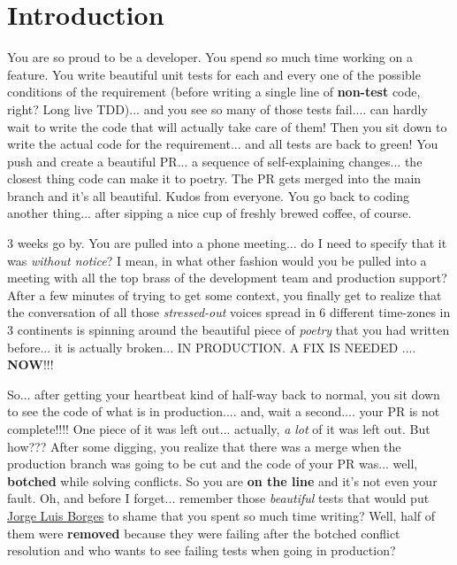 
\section{Introduction}

You are so proud to be a developer. You spend so much time working on a feature. You write beautiful unit tests
for each and every one of the possible conditions of the requirement (before writing a single
line of {\bf non-test} code, right? Long live TDD)... and you see so many of those tests fail.... can hardly wait to
write the code that will actually take care of them! Then you sit down to write the actual code for the requirement...
and all tests are back to green! You push and create a beautiful PR... a sequence of self-explaining changes...
the closest thing code can make it to poetry. The PR gets merged into the main branch and it's all beautiful. Kudos
from everyone. You go back to coding another thing... after sipping a nice cup of freshly brewed coffee, of course.

3 weeks go by. You are pulled into a phone meeting... do I need to specify that it was {\it without notice}? I mean,
in what other fashion would you be pulled into a meeting with all the top brass of the development team and production
support? After a few minutes of trying to get some context, you finally get to realize that the conversation
of all those {\it stressed-out} voices spread in 6 different time-zones in 3 continents is spinning around the beautiful
piece of {\it poetry} that you had written before... it is actually broken... IN PRODUCTION. A FIX IS NEEDED .... {\bf NOW}!!!

So... after getting your heartbeat kind of half-way back to normal, you sit down to see the code of what is in production....
and, wait a second.... your PR is not complete!!!! One piece of it was left out... actually, {\it a lot} of it was left
out. But how??? After some digging, you realize that there was a merge when the production branch was going to be cut
and the code of your PR was... well, {\bf botched} while solving conflicts. So you are {\bf on the line} and it's not
even your fault. Oh, and before I forget... remember those {\it beautiful} tests that would put
\href{https://en.wikipedia.org/wiki/Jorge_Luis_Borges}{Jorge Luis Borges} to shame that you spent so much time writing?
Well, half of them were {\bf removed} because they were failing after the botched conflict resolution and who wants to
see failing tests when going in production?

